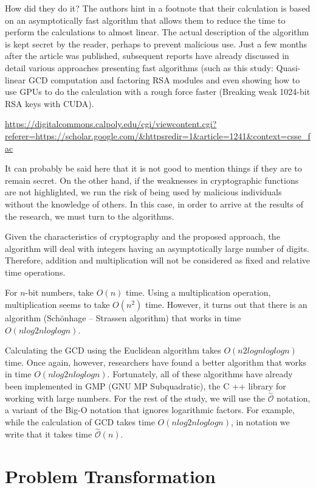 \documentclass[graybox]{svmult}
\begin{document}
How did they do it? The authors hint in a footnote that their calculation is based on an asymptotically fast algorithm that allows them to reduce the time to perform the calculations to almost linear. The actual description of the algorithm is kept secret by the reader, perhaps to prevent malicious use. Just a few months after the article was published, subsequent reports have already discussed in detail various approaches presenting fast algorithms (such as this study: Quasi-linear GCD computation and factoring RSA modules and even showing how to use GPUs to do the calculation with a rough force faster (Breaking weak 1024-bit RSA keys with CUDA). 

\url{https://digitalcommons.calpoly.edu/cgi/viewcontent.cgi?referer=https://scholar.google.com/&httpsredir=1&article=1241&context=csse_fac}

It can probably be said here that it is not good to mention things if they are to remain secret. On the other hand, if the weaknesses in cryptographic functions are not highlighted, we run the risk of being used by malicious individuals without the knowledge of others. In this case, in order to arrive at the results of the research, we must turn to the algorithms. 

Given the characteristics of cryptography and the proposed approach, the algorithm will deal with integers having an asymptotically large number of digits. Therefore, addition and multiplication will not be considered as fixed and relative time operations.

For $n$-bit numbers, take $O(n)$ time. Using a multiplication operation, multiplication seems to take $O(n^2)$ time. However, it turns out that there is an algorithm (Schönhage – Strassen algorithm) that works in time $O(n log 2 n log log n)$.

Calculating the GCD using the Euclidean algorithm takes $O(n2 log n log log n)$ time. Once again, however, researchers have found a better algorithm that works in time $O (n log 2 n log log n)$. Fortunately, all of these algorithms have already been implemented in GMP (GNU MP Subquadratic), the C ++ library for working with large numbers. For the rest of the study, we will use the $\overset{\sim}{\mathcal{O}}$ notation, a variant of the Big-O notation that ignores logarithmic factors. For example, while the calculation of GCD takes time $O (n log 2 n log log n)$, in notation we write that it takes time $\overset{\sim}{\mathcal{O}}(n)$.

\section{Problem Transformation}
\label{sec:2}
\end{document}
